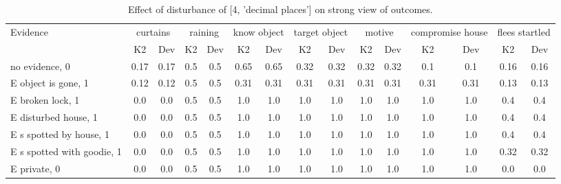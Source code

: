 \begin{table}\begin{tabular}{l|cc|cc|cc|cc|cc|cc|cc}\toprule\multirow{2}{*}{Evidence} & \multicolumn{2}{c}{curtains}& \multicolumn{2}{c}{raining}& \multicolumn{2}{c}{know object}& \multicolumn{2}{c}{target object}& \multicolumn{2}{c}{motive}& \multicolumn{2}{c}{compromise house}& \multicolumn{2}{c}{flees startled}\\& {K2} & {Dev}& {K2} & {Dev}& {K2} & {Dev}& {K2} & {Dev}& {K2} & {Dev}& {K2} & {Dev}& {K2} & {Dev}\\\midrule
no evidence, 0 & 0.17&0.17&0.5&0.5&0.65&0.65&0.32&0.32&0.32&0.32&0.1&0.1&0.16&0.16\\E object is gone, 1 & 0.12&0.12&0.5&0.5&0.31&0.31&0.31&0.31&0.31&0.31&0.31&0.31&0.13&0.13\\E broken lock, 1 & 0.0&0.0&0.5&0.5&1.0&1.0&1.0&1.0&1.0&1.0&1.0&1.0&0.4&0.4\\E disturbed house, 1 & 0.0&0.0&0.5&0.5&1.0&1.0&1.0&1.0&1.0&1.0&1.0&1.0&0.4&0.4\\E s spotted by house, 1 & 0.0&0.0&0.5&0.5&1.0&1.0&1.0&1.0&1.0&1.0&1.0&1.0&0.4&0.4\\E s spotted with goodie, 1 & 0.0&0.0&0.5&0.5&1.0&1.0&1.0&1.0&1.0&1.0&1.0&1.0&0.32&0.32\\E private, 0 & 0.0&0.0&0.5&0.5&1.0&1.0&1.0&1.0&1.0&1.0&1.0&1.0&0.0&0.0\\\bottomrule\end{tabular}\caption{Effect of disturbance of [4, 'decimal places'] on strong view of outcomes.}\end{table}